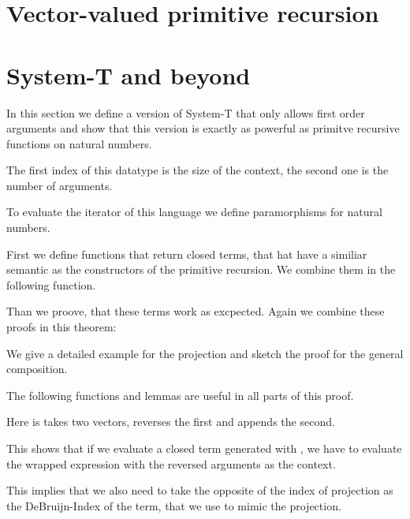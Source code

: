 \documentclass{jfp}
\begin{document}
\section{Vector-valued primitive recursion}
\label{sec:vect-valu-prim}

\section{System-T and beyond}
\label{sec:system-t-beyond}

In this section we define a version of System-T that only allows first order arguments and show that this version is exactly as powerful as primitve recursive functions on natural numbers.

The first index of this datatype is the size of the context, the second one is the number of arguments. 


To evaluate the iterator of this language we define paramorphisms for natural numbers. 


\para
\evalST


First we define functions that return closed terms, that hat have a similiar semantic as the constructors of the primitive recursion. We combine them in the following function.


\prToStSig

Than we proove, that these terms work as excpected.
Again we combine these proofs in this theorem: 
\embedPRSTSoundSig


We give a detailed example for the projection and sketch the proof for the general composition.

The following functions and lemmas are useful in all parts of this proof.

\prepLambdas



Here  is takes two vectors, reverses the first and appends the second.
\appendR

This shows that if we evaluate a closed term generated with , we have to evaluate the wrapped expression with the reversed arguments as the context.

This implies that we also need to take the opposite of the index of projection as the DeBruijn-Index of the term, that we use to mimic the projection.

\mkProj

\lookupOpRev
\end{document}

